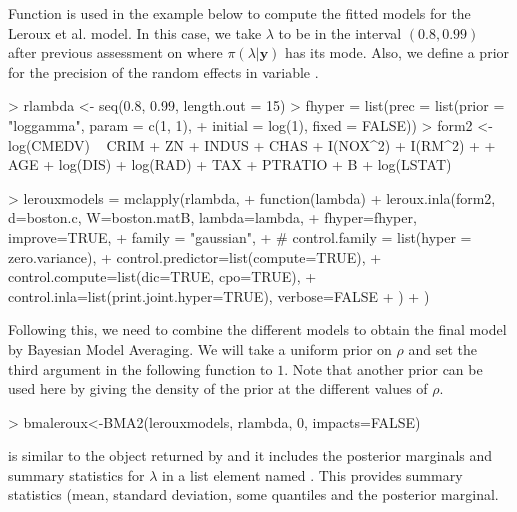 \documentclass[article]{jss}
\begin{document}
Function  is used in the example below to compute the fitted
models for the Leroux et al. model.  In this case, we take $\lambda$ to be in
the interval $(0.8,0.99)$ after previous assessment on where
$\pi(\lambda|\mathbf{y})$ has its mode. Also, we define a prior for the
precision of the random effects in variable .

\begin{Schunk}
\begin{Sinput}
> rlambda <- seq(0.8, 0.99, length.out = 15)
> fhyper = list(prec = list(prior = "loggamma", param = c(1, 1), 
+     initial = log(1), fixed = FALSE))
> form2 <- log(CMEDV) ~ CRIM + ZN + INDUS + CHAS + I(NOX^2) + I(RM^2) + 
+     AGE + log(DIS) + log(RAD) + TAX + PTRATIO + B + log(LSTAT)
\end{Sinput}
\end{Schunk}

\begin{Schunk}
\begin{Sinput}
> lerouxmodels = mclapply(rlambda,
+         function(lambda) {
+                 leroux.inla(form2, d=boston.c, W=boston.matB, lambda=lambda,
+                         fhyper=fhyper, improve=TRUE,
+                         family = "gaussian",
+ #   control.family = list(hyper = zero.variance),
+                         control.predictor=list(compute=TRUE),
+                         control.compute=list(dic=TRUE, cpo=TRUE),
+                         control.inla=list(print.joint.hyper=TRUE), verbose=FALSE
+                 )
+         })
\end{Sinput}
\end{Schunk}






Following this, we need to combine the different models to obtain the final
model by Bayesian Model Averaging. We will take a uniform prior on $\rho$ and
set the third argument in the following function to $1$. Note that another
prior can be used here by giving the density of the prior at the different
values of $\rho$.



\begin{Schunk}
\begin{Sinput}
> bmaleroux<-BMA2(lerouxmodels, rlambda, 0, impacts=FALSE)
\end{Sinput}
\end{Schunk}


\noindent
{} is similar to the object returned by  and it
includes the posterior marginals and summary statistics for $\lambda$
in a list element named . This provides summary statistics (mean,
standard deviation, some quantiles and the posterior marginal.
\end{document}
